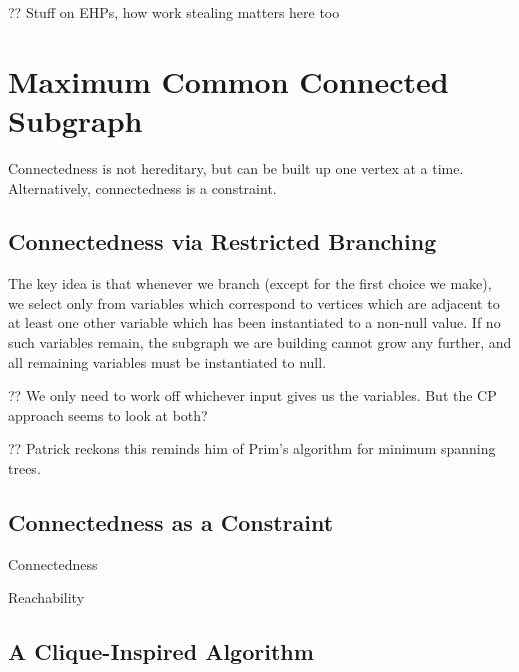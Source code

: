 \documentclass{llncs}
\begin{document}
?? Stuff on EHPs, how work stealing matters here too

\section{Maximum Common Connected Subgraph}

Connectedness is not hereditary, but can be built up one vertex at a time. Alternatively,
connectedness is a constraint.

\subsection{Connectedness via Restricted Branching}

The key idea is that whenever we branch (except for the first choice we make), we select only from
variables which correspond to vertices which are adjacent to at least one other variable which has
been instantiated to a non-null value. If no such variables remain, the subgraph we are building
cannot grow any further, and all remaining variables must be instantiated to null.

?? We only need to work off whichever input gives us the variables. But the CP approach seems to
look at both?

?? Patrick reckons this reminds him of Prim's algorithm for minimum spanning trees.

\subsection{Connectedness as a Constraint}

Connectedness \cite{Brown:2005}

Reachability \cite{DBLP:conf/cp/DoomsDD05,DBLP:conf/cp/QuesadaRD05}

\subsection{A Clique-Inspired Algorithm}
\end{document}
